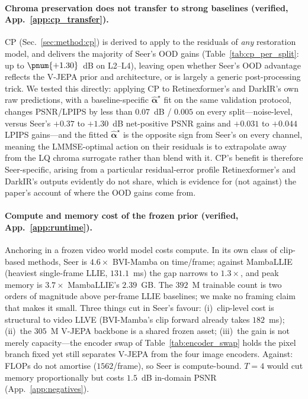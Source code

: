 \paragraph{Chroma preservation does not transfer to strong baselines (verified, App.~\ref{app:cp_transfer}).} CP (Sec.~\ref{sec:method:cp}) is derived to apply to the residuals of \emph{any} restoration model, and delivers the majority of Seer's OOD gains (Table~\ref{tab:cp_per_split}: up to $\pnum{+1.30}$~dB on L2--L4), leaving open whether Seer's OOD advantage reflects the V-JEPA prior and architecture, or is largely a generic post-processing trick. We tested this directly: applying CP to Retinexformer's and DarkIR's own raw predictions, with a baseline-specific $\widehat{\boldsymbol{\alpha}}^{\star}$ fit on the same validation protocol, changes PSNR/LPIPS by less than $0.07$~dB / $0.005$ on every split---noise-level, versus Seer's $+0.37$ to $+1.30$~dB net-positive PSNR gains and $+0.031$ to $+0.044$ LPIPS gains---and the fitted $\widehat{\boldsymbol{\alpha}}^{\star}$ is the opposite sign from Seer's on every channel, meaning the LMMSE-optimal action on their residuals is to extrapolate away from the LQ chroma surrogate rather than blend with it. CP's benefit is therefore Seer-specific, arising from a particular residual-error profile Retinexformer's and DarkIR's outputs evidently do not share, which is evidence for (not against) the paper's account of where the OOD gains come from.

\paragraph{Compute and memory cost of the frozen prior (verified, App.~\ref{app:runtime}).} Anchoring in a frozen video world model costs compute. In its own class of clip-based methods, Seer is $4.6\times$ BVI-Mamba on time/frame; against MambaLLIE (heaviest single-frame LLIE, $131.1$~ms) the gap narrows to $1.3\times$, and peak memory is $3.7\times$ MambaLLIE's $2.39$~GB. The $392$~M trainable count is two orders of magnitude above per-frame LLIE baselines; we make no framing claim that makes it small. Three things cut in Seer's favour: (i)~clip-level cost is structural to video LLVE (BVI-Mamba's clip forward already takes $182$~ms); (ii)~the $305$~M V-JEPA backbone is a shared frozen asset; (iii)~the gain is not merely capacity---the encoder swap of Table~\ref{tab:encoder_swap} holds the pixel branch fixed yet still separates V-JEPA from the four image encoders. Against: FLOPs do not amortise ($1562$/frame), so Seer is compute-bound. $T{=}4$ would cut memory proportionally but costs $1.5$~dB in-domain PSNR (App.~\ref{app:negatives}).

